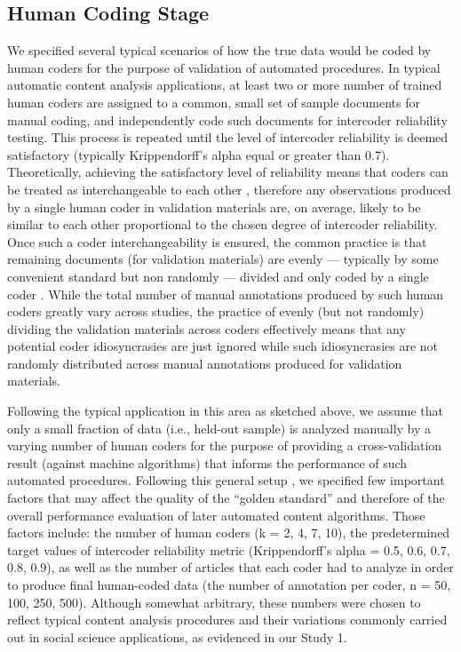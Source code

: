 \documentclass[man, 12pt, a4paper, nolmodern, noextraspace]{apa6}
\begin{document}
    \subsection{Human Coding Stage}
    
    We specified several typical scenarios of how the true data would be coded by human coders for the purpose of validation of automated procedures. In typical automatic content analysis applications, at least two or more number of trained human coders are assigned to a common, small set of sample documents for manual coding, and independently code such documents for intercoder reliability testing. This process is repeated until the level of intercoder reliability is deemed satisfactory (typically Krippendorff’s alpha equal or greater than 0.7). Theoretically, achieving the satisfactory level of reliability means that coders can be treated as interchangeable to each other \parencite{krippendorff2004reliability}, therefore any observations produced by a single human coder in validation materials are, on average, likely to be similar to each other proportional to the chosen degree of intercoder reliability. Once such a coder interchangeability is ensured, the common practice is that remaining documents (for validation materials) are evenly --- typically by some convenient standard but non randomly --- divided and only coded by a single coder \parencite{grimmer2018unreliability}. While the total number of manual annotations produced by such human coders greatly vary across studies, the practice of evenly (but not randomly) dividing the validation materials across coders effectively means that any potential coder idiosyncrasies are just ignored while such idiosyncrasies are not randomly distributed across manual annotations produced for validation materials.      
    
    Following the typical application in this area as sketched above, we assume that only a small fraction of data (i.e., held-out sample) is analyzed manually by a varying number of human coders for the purpose of providing a cross-validation result (against machine algorithms) that informs the performance of such automated procedures. Following this general setup \parencites[e.g.,][]{grimmer2018unreliability}, we specified few important factors that may affect the quality of the “golden standard” and therefore of the overall performance evaluation of later automated content algorithms. Those factors include: the number of human coders (k = 2, 4, 7, 10), the predetermined target values of intercoder reliability metric (Krippendorff's alpha = 0.5, 0.6, 0.7, 0.8, 0.9), as well as the number of articles that each coder had to analyze in order to produce final human-coded data (the number of annotation per coder, n = 50, 100, 250, 500). Although somewhat arbitrary, these numbers were chosen to reflect typical content analysis procedures and their variations commonly carried out in social science applications, as evidenced in our Study 1. 
    
\end{document}
